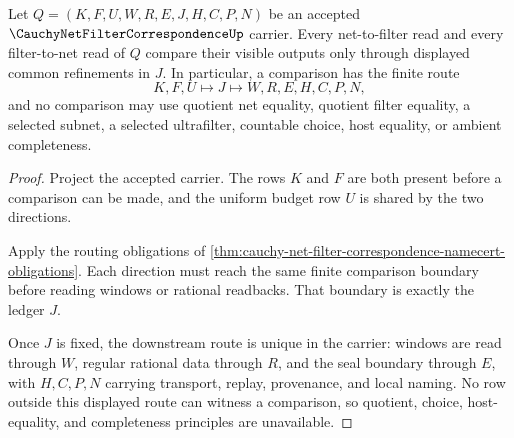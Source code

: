 \begin{theorem}
\label{thm:cauchy-net-filter-correspondence-common-refinement}
Let $Q=(K,F,U,W,R,E,J,H,C,P,N)$ be an accepted $\CauchyNetFilterCorrespondenceUp$ carrier. Every net-to-filter read and every filter-to-net read of $Q$ compare their visible outputs only through displayed common refinements in $J$. In particular, a comparison has the finite route
$$
K,F,U \longmapsto J \longmapsto W,R,E,H,C,P,N ,
$$
and no comparison may use quotient net equality, quotient filter equality, a selected subnet, a selected ultrafilter, countable choice, host equality, or ambient completeness.
\end{theorem}
\begin{proof}
Project the accepted carrier. The rows $K$ and $F$ are both present before a comparison can be made, and the uniform budget row $U$ is shared by the two directions.

Apply the routing obligations of \autoref{thm:cauchy-net-filter-correspondence-namecert-obligations}. Each direction must reach the same finite comparison boundary before reading windows or rational readbacks. That boundary is exactly the ledger $J$.

Once $J$ is fixed, the downstream route is unique in the carrier: windows are read through $W$, regular rational data through $R$, and the seal boundary through $E$, with $H,C,P,N$ carrying transport, replay, provenance, and local naming. No row outside this displayed route can witness a comparison, so quotient, choice, host-equality, and completeness principles are unavailable.
\end{proof}

